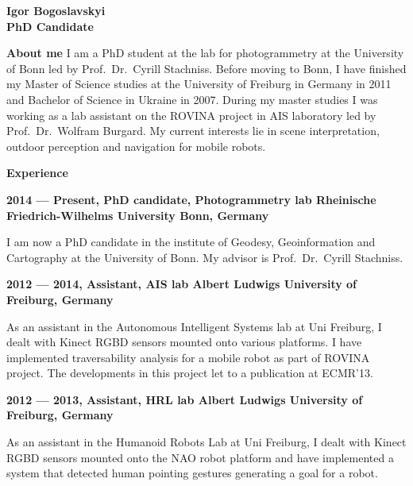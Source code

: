 \documentclass[a4paper,12pt,final]{memoir}
\newcommand{\Sep}{\vspace{1.5em}}
\newcommand{\SmallSep}{\vspace{0.5em}}
\newenvironment{AboutMe}
	{\ignorespaces\textbf{\color{Black} About me}}
	{\Sep\ignorespacesafterend}
\newcommand{\CVSection}[1]
	{\Large\textbf{#1}\par
	\SmallSep\normalsize\normalfont}
\newcommand{\CVItem}[1]
	{\textbf{\color{MidnightBlue} #1}}
\begin{document}
\framebreak{}


\Huge\bfseries {\color{MidnightBlue} Igor Bogoslavskyi} \\
\Large\bfseries  PhD Candidate \\

\normalsize\normalfont{}

\begin{AboutMe}
\newline
I am a PhD student at the lab for photogrammetry at the University of Bonn led
by Prof.~Dr.~Cyrill Stachniss. Before moving to Bonn, I have finished my
Master of Science studies at the University of Freiburg in Germany in 2011 and
Bachelor of Science in Ukraine in 2007. During my master studies I was working
as a lab assistant on the ROVINA project in AIS laboratory led by
Prof.~Dr.~Wolfram Burgard. My current interests lie in scene interpretation,
outdoor perception and navigation for mobile robots.
\end{AboutMe}

\CVSection{Experience}
\CVItem{2014 --- Present, PhD candidate, Photogrammetry lab
\newline Rheinische Friedrich-Wilhelms University Bonn, Germany}
\begin{compactitem}[\color{RoyalBlue}$\circ$]
\item I am now a PhD candidate in the institute of Geodesy, Geoinformation and
Cartography at the University of Bonn. My advisor is Prof.~Dr.~Cyrill
Stachniss.
\end{compactitem}
\SmallSep

\CVItem{2012 --- 2014, Assistant, AIS lab
\newline Albert Ludwigs University of Freiburg, Germany}
\begin{compactitem}[\color{RoyalBlue}$\circ$]
\item As an assistant in the Autonomous Intelligent Systems lab at Uni
Freiburg, I dealt with Kinect RGBD sensors mounted onto various platforms. I
have implemented traversability analysis for a mobile robot as part of ROVINA
project. The developments in this project let to a publication at ECMR'13.
\end{compactitem}
\SmallSep

\CVItem{2012 --- 2013, Assistant, HRL lab
\newline Albert Ludwigs University of Freiburg, Germany}
\begin{compactitem}[\color{RoyalBlue}$\circ$]
	\item As an assistant in the Humanoid Robots Lab at Uni Freiburg, I dealt
	with Kinect RGBD sensors mounted onto the NAO robot platform and have
	implemented a system that detected human pointing gestures generating a goal
	for a robot.
\end{compactitem}
\SmallSep
\end{document}
